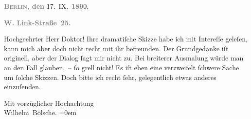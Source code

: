 \pstart
           \raggedleft{}\textcolor{gray}{\textbf{\textsc{Berlin}, den}}{ }17. IX. \textcolor{gray}{\textbf{189}}0.\pend
           
\pstart
           \raggedleft{}\textcolor{gray}{\textbf{W. Link-Straße 25.}}\pend
           
\pstart\center{}Hochgeehrter Herr Doktor!\pend\vspace{0.5em}
\pstart
           Ihre dramatiſche Skizze habe
               ich mit Intereſſe geleſen, kann mich aber doch nicht recht mit ihr befreunden. Der
               Grundgedanke iſt originell, aber der Dialog ſagt mir nicht zu. Bei breiterer
               Ausmalung würde man an den Fall glauben, – ſo grell nicht! Es iſt eben eine
               verzweifelt ſchwere Sache um ſolche Skizzen. Doch bitte ich recht ſehr, gelegentlich
               etwas anderes einzuſenden.\pend
           
\pstart
           Mit vorzüglicher Hochachtung{\\[\baselineskip]}\spacefill\mbox{Wilhelm Bölsche.}\pend
           \leftskip=0em{}\endnumbering{}  
      